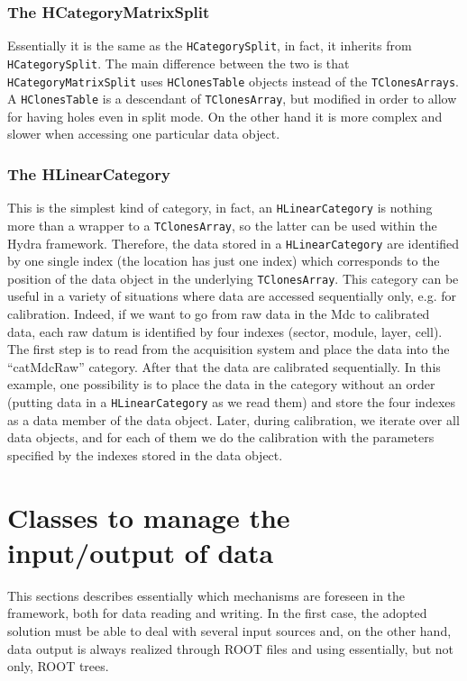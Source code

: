 \subsubsection{The HCategoryMatrixSplit}

Essentially it is the same as the \verb+HCategorySplit+, in fact, it inherits 
from \verb+HCategorySplit+. The main difference between the two is that 
\verb+HCategoryMatrixSplit+ uses \verb+HClonesTable+ objects instead of the 
\verb+TClonesArrays+. A \verb+HClonesTable+ is a descendant of \verb+TClonesArray+, 
but modified in order to allow for having holes even in split mode. On the other 
hand it is more complex and slower when accessing one particular data object.

\subsubsection{The HLinearCategory}

This is the simplest kind of category, in fact, an \verb+HLinearCategory+ is 
nothing more than a wrapper to a \verb+TClonesArray+, so the latter can be 
used within the Hydra framework. Therefore, the data stored in a \verb+HLinearCategory+ 
are identified by one single index (the location has just one index) which 
corresponds to the position of the data object in the underlying \verb+TClonesArray+.
This category can be useful in a variety of situations where data are accessed 
sequentially only, e.g. for calibration. Indeed, if we want to go from raw data 
in the Mdc to calibrated data, each raw datum is identified by four indexes 
(sector, module, layer, cell). The first step is to read from the acquisition 
system and place the data into the ``catMdcRaw'' category. After that the data 
are calibrated sequentially. In this example, one possibility is to place the 
data in the category without an order (putting data in a \verb+HLinearCategory+ 
as we read them) and store the four indexes as a data member of the data object. 
Later, during calibration, we iterate over all data objects, and for each of 
them we do the calibration with the parameters specified by the indexes stored 
in the data object.

\section{Classes to manage the input/output of data}

This sections describes essentially which mechanisms are foreseen in the framework, 
both for data reading and writing. In the first case, the adopted solution must be 
able to deal with several input sources and, on the other hand, data output is always 
realized through ROOT files and using essentially, but not only, ROOT trees.

